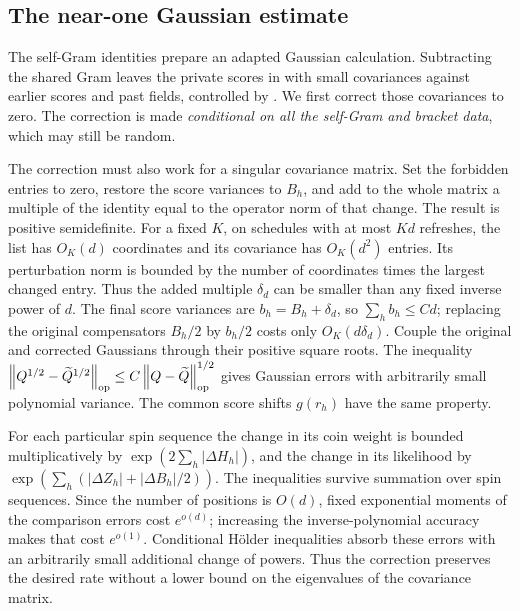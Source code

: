 \subsection{The near-one Gaussian estimate}

The self-Gram identities prepare an adapted Gaussian calculation.
Subtracting the shared Gram leaves the private scores in
 with small covariances against earlier
scores and past fields, controlled by .
We first correct those covariances to zero.  The correction is made
\emph{conditional on all the self-Gram and bracket data}, which may
still be random.

The correction must also work for a singular covariance matrix.  Set
the forbidden entries to zero, restore the score variances to $B_h$,
and add to the whole matrix a multiple of the identity equal to the
operator norm of that change.  The result is positive semidefinite.
For a fixed $K$, on schedules with at most $Kd$ refreshes, the list has $O_K(d)$
coordinates and its covariance has $O_K(d^2)$ entries. Its perturbation
norm is bounded by the number of coordinates times the largest changed
entry. Thus the added multiple $\delta_d$ can be smaller than any fixed
inverse power of $d$. The final score variances are
$b_h=B_h+\delta_d$, so $\sum_hb_h\le Cd$; replacing the original
compensators $B_h/2$ by $b_h/2$ costs only $O_K(d\delta_d)$.  Couple the original and corrected Gaussians through their
positive square roots.
The inequality
$\left\lVert Q^{1/2}-\widetilde Q^{1/2}\right\rVert_{\mathrm{op}}
 \le C\left\lVert Q-\widetilde Q\right\rVert_{\mathrm{op}}^{1/2}$
gives Gaussian errors with arbitrarily small polynomial variance.
The common score shifts $g(r_h)$ have the same property.

For each particular spin sequence the change in its coin weight is
bounded multiplicatively by
$\exp(2\sum_h|\Delta H_h|)$, and the change in its likelihood by
$\exp(\sum_h(|\Delta Z_h|+|\Delta B_h|/2))$.
The inequalities survive summation over spin sequences.  Since the
number of positions is $O(d)$, fixed exponential moments of the
comparison errors cost $e^{o(d)}$; increasing the inverse-polynomial
accuracy makes that cost $e^{o(1)}$.  Conditional H\"older inequalities
absorb these errors with an arbitrarily small additional change of
powers.  Thus the correction preserves the desired rate without a
lower bound on the eigenvalues of the covariance matrix.

